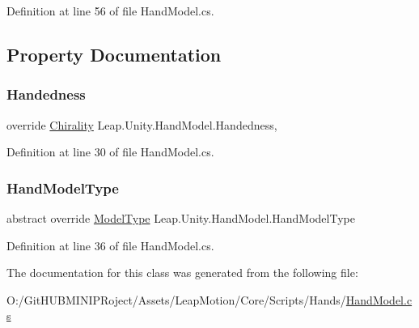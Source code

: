 Definition at line 56 of file Hand\+Model.\+cs.



\subsection{Property Documentation}
\mbox{\label{class_leap_1_1_unity_1_1_hand_model_adc0cdab6a0de6c0520a100bfff19a6cd}} 
\subsubsection{\texorpdfstring{Handedness}{Handedness}}
{\footnotesize\ttfamily override \mbox{\hyperlink{namespace_leap_1_1_unity_a4d15adcf20ba121b2cd9c07f503b606f}{Chirality}} Leap.\+Unity.\+Hand\+Model.\+Handedness\hspace{0.3cm}{\ttfamily [get]}, {\ttfamily [set]}}



Definition at line 30 of file Hand\+Model.\+cs.

\mbox{\label{class_leap_1_1_unity_1_1_hand_model_ab4ffcf0352b78eea4981a4498656fb93}} 
\subsubsection{\texorpdfstring{HandModelType}{HandModelType}}
{\footnotesize\ttfamily abstract override \mbox{\hyperlink{namespace_leap_1_1_unity_a186e5eb0a2b743f1f6b79346f0ab8ad0}{Model\+Type}} Leap.\+Unity.\+Hand\+Model.\+Hand\+Model\+Type\hspace{0.3cm}{\ttfamily [get]}}



Definition at line 36 of file Hand\+Model.\+cs.



The documentation for this class was generated from the following file\+:\begin{DoxyCompactItemize}
\item 
O\+:/\+Git\+H\+U\+B\+M\+I\+N\+I\+P\+Roject/\+Assets/\+Leap\+Motion/\+Core/\+Scripts/\+Hands/\mbox{\hyperlink{_hand_model_8cs}{Hand\+Model.\+cs}}\end{DoxyCompactItemize}
